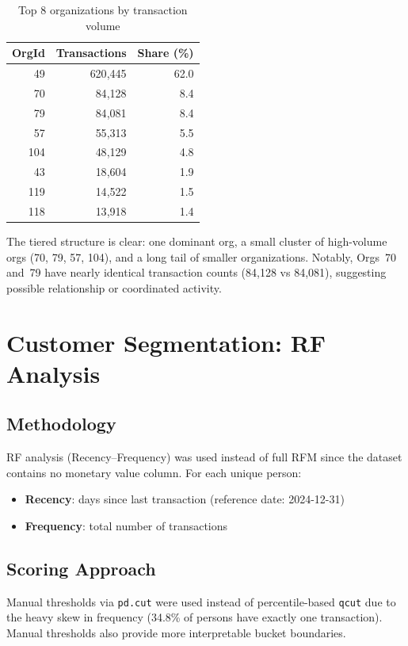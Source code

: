 \documentclass[11pt,a4paper]{article}
\begin{document}
\begin{table}[H]
\centering
\begin{tabular}{rrr}
\toprule
\textbf{OrgId} & \textbf{Transactions} & \textbf{Share (\%)} \\
\midrule
49 & 620{,}445 & 62.0 \\
70 & 84{,}128 & 8.4 \\
79 & 84{,}081 & 8.4 \\
57 & 55{,}313 & 5.5 \\
104 & 48{,}129 & 4.8 \\
43 & 18{,}604 & 1.9 \\
119 & 14{,}522 & 1.5 \\
118 & 13{,}918 & 1.4 \\
\bottomrule
\end{tabular}
\caption{Top 8 organizations by transaction volume}
\end{table}

The tiered structure is clear: one dominant org, a small cluster of high-volume orgs (70, 79, 57, 104), and a long tail of smaller organizations. Notably, Orgs~70 and~79 have nearly identical transaction counts (84{,}128 vs 84{,}081), suggesting possible relationship or coordinated activity.

\section{Customer Segmentation: RF Analysis}

\subsection{Methodology}

RF analysis (Recency--Frequency) was used instead of full RFM since the dataset contains no monetary value column. For each unique person:
\begin{itemize}
    \item \textbf{Recency}: days since last transaction (reference date: 2024-12-31)
    \item \textbf{Frequency}: total number of transactions
\end{itemize}

\subsection{Scoring Approach}

Manual thresholds via \texttt{pd.cut} were used instead of percentile-based \texttt{qcut} due to the heavy skew in frequency (34.8\% of persons have exactly one transaction). Manual thresholds also provide more interpretable bucket boundaries.
\end{document}
